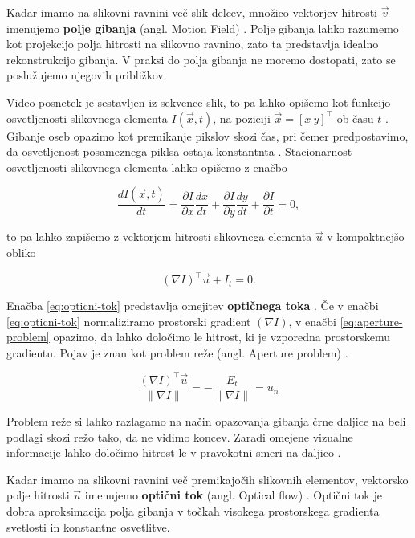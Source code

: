 Kadar imamo na slikovni ravnini več slik delcev, množico vektorjev hitrosti $\vec{v}$ imenujemo \textbf{polje gibanja} (angl. Motion Field) \cite{trucco1998introductory}. Polje gibanja lahko razumemo kot projekcijo polja hitrosti na slikovno ravnino, zato ta predstavlja idealno rekonstrukcijo gibanja. V praksi do polja gibanja ne moremo dostopati, zato se poslužujemo njegovih približkov.  

Video posnetek je sestavljen iz sekvence slik, to pa lahko opišemo kot funkcijo osvetljenosti slikovnega elementa $I(\vec{x},t)$, na poziciji $\vec{x} = [x~y]^\top$ ob času $t$ \cite{wedel2011stereo}. Gibanje oseb opazimo kot premikanje pikslov skozi čas, pri čemer predpostavimo, da osvetljenost posameznega piklsa ostaja konstantnta \cite{trucco1998introductory}. Stacionarnost osvetljenosti slikovnega elementa lahko opišemo z enačbo  

\begin{equation}
	\frac{d I(\vec{x}, t)}{dt} = \frac{\partial I}{\partial x} \frac{dx}{dt} + \frac{\partial I}{\partial y} \frac{dy}{dt} + \frac{\partial I}{\partial t} = 0,
\end{equation}

to pa lahko zapišemo z vektorjem hitrosti slikovnega elementa $\vec{u}$ v kompaktnejšo obliko

\begin{equation}\label{eq:opticni-tok}
	(\nabla I)^\top \vec{u} + I_t = 0.
\end{equation}

Enačba \eqref{eq:opticni-tok} predstavlja omejitev \textbf{optičnega toka} \cite{trucco1998introductory}. Če v enačbi \eqref{eq:opticni-tok} normaliziramo prostorski gradient $(\nabla I)$, v enačbi \eqref{eq:aperture-problem} opazimo, da lahko  določimo le hitrost, ki je vzporedna prostorskemu gradientu. Pojav je znan kot problem reže (angl. Aperture problem) \cite{trucco1998introductory}. 

\begin{equation}\label{eq:aperture-problem}
	\frac{(\nabla I)^\top \vec{u}}{\| \nabla I \|} = - \frac{E_t}{\| \nabla I \|} = u_n
\end{equation}

Problem reže si lahko razlagamo na način opazovanja gibanja črne daljice na beli podlagi skozi režo tako, da ne vidimo koncev. Zaradi omejene vizualne informacije lahko določimo hitrost le v pravokotni smeri na daljico \cite{trucco1998introductory}. 

Kadar imamo na slikovni ravnini več premikajočih slikovnih elementov, vektorsko polje hitrosti $\vec{u}$ imenujemo \textbf{optični tok} (angl. Optical flow) \cite{trucco1998introductory}. Optični tok je dobra aproksimacija polja gibanja v točkah visokega prostorskega gradienta svetlosti in konstantne osvetlitve.



